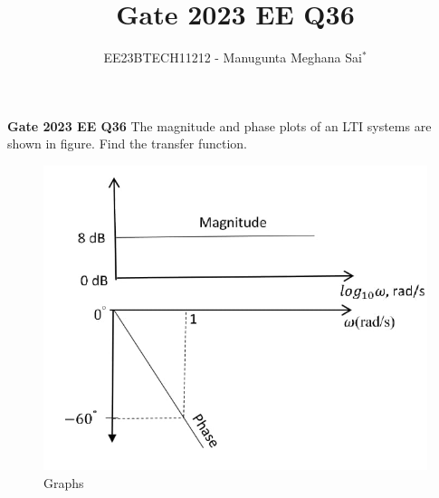 \documentclass[journal,12pt,twocolumn]{IEEEtran}
\theoremstyle{remark}
\begin{document}
    
    
    \vspace{3cm}
    
    \title{Gate 2023 EE Q36}
    \author{EE23BTECH11212 - Manugunta Meghana Sai$^{*}$%
    }
    \maketitle
    \newpage
    \bigskip
    
    \renewcommand{\thefigure}{\theenumi}
    \renewcommand{\thetable}{\theenumi}
    
    \vspace{3cm}
    \textbf{Gate 2023 EE Q36} 
    The magnitude and phase plots of an LTI systems are shown in figure. Find the transfer function.\\
    \begin{figure}[h!]
        \centering
        \includegraphics[width=\columnwidth]{figs/gate.jpeg}
        \caption{Graphs}
        \label{fig:1ee36}
    \end{figure}
    
\end{document}
